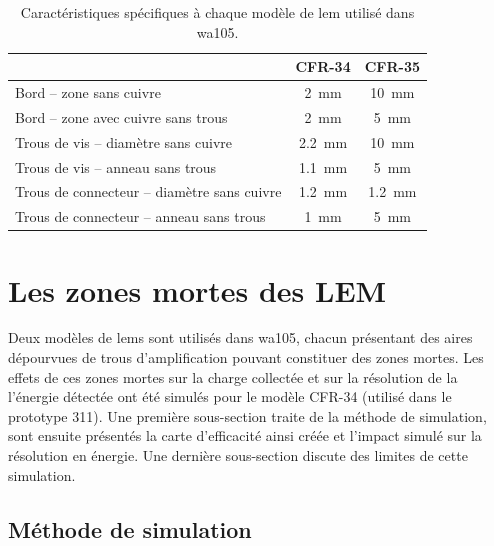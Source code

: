             \begin{table}\label{tab::lem-diff}
                \centering
                \begin{tabular}{|l|c|c|}
                    \hline
                     & CFR-34 & CFR-35\\
                    \hline
                    Bord -- zone sans cuivre & \SI{2}{\milli\meter} & \SI{10}{\milli\meter}\\
                    Bord -- zone avec cuivre sans trous & \SI{2}{\milli\meter} & \SI{5}{\milli\meter}\\
                    Trous de vis -- diamètre sans cuivre & \SI{2.2}{\milli\meter} & \SI{10}{\milli\meter} \\
                    Trous de vis -- anneau sans trous &  \SI{1.1}{\milli\meter} & \SI{5}{\milli\meter} \\
                    Trous de connecteur -- diamètre sans cuivre & \SI{1.2}{\milli\meter} & \SI{1.2}{\milli\meter} \\
                    Trous de connecteur -- anneau sans trous & \SI{1}{\milli\meter} & \SI{5}{\milli\meter} \\
                    \hline
                \end{tabular}
                \caption{Caractéristiques spécifiques à chaque modèle de \gls{lem} utilisé dans \gls{wa105}.}
            \end{table}
            
        
    \section{Les zones mortes des LEM}\label{sec::zones_mortes}
    
        Deux modèles de \glspl{lem} sont utilisés dans \gls{wa105}, chacun présentant des aires dépourvues de trous d'amplification pouvant constituer des zones mortes. Les effets de ces zones mortes sur la charge collectée et sur la résolution de la l'énergie détectée ont été simulés pour le modèle CFR-34 (utilisé dans le prototype 311). Une première sous-section traite de la méthode de simulation, sont ensuite présentés la carte d'efficacité ainsi créée et l'impact simulé sur la résolution en énergie. Une dernière sous-section discute des limites de cette simulation.
        
        \subsection{Méthode de simulation}
        
